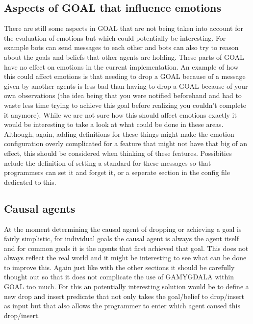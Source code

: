 \documentclass[11pt]{article}
\begin{document}
\subsection{Aspects of GOAL that influence emotions}
There are still some aspects in GOAL that are not being taken into account for the evaluation of emotions but which could potentially be interesting. For example bots can send messages to each other and bots can also try to reason about the goals and beliefs that other agents are holding. These parts of GOAL have no effect on emotions in the current implementation. An example of how this could affect emotions is that needing to drop a GOAL because of a message given by another agents is less bad than having to drop a GOAL because of your own observations (the idea being that you were notified beforehand and had to waste less time trying to achieve this goal before realizing you couldn't complete it anymore). While we are not sure how this should affect emotions exactly it would be interesting to take a look at what could be done in these areas. Although, again, adding definitions for these things might make the emotion configuration overly complicated for a feature that might not have that big of an effect, this should be considered when thinking of these features. Possibities nclude the definition of setting a standard for these messages so that programmers can set it and forget it, or a seperate section in the config file dedicated to this.

\subsection{Causal agents}
At the moment determining the causal agent of dropping or achieving a goal is fairly simplistic, for individual goals the causal agent is always the agent itself and for common goals it is the agents that first achieved that goal. This does not always reflect the real world and it might be interesting to see what can be done to improve this. Again just like with the other sections it should be carefully thought out so that it does not complicate the use of GAMYGDALA within GOAL too much. For this an potentially interesting solution would be to define a new drop and insert predicate that not only takes the goal/belief to drop/insert as input but that also allows the programmer to enter which agent caused this drop/insert.
\end{document}
